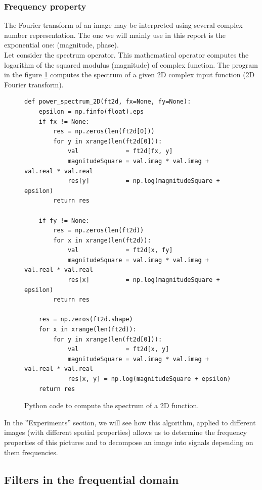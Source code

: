 \documentclass[a4paper]{article}
\begin{document}
        \subsubsection{Frequency property}
        The Fourier transform of an image may be interpreted using several complex number representation.  The one we will mainly use in this report is the exponential one: (magnitude, phase).\\
        Let consider the spectrum operator.   This mathematical operator computes the logarithm of the squared modulus (magnitude) of complex function.   The program in the figure \ref{spectrum2D.py} computes the spectrum of a given 2D complex input function (2D Fourier transform).

        \begin{figure}[h!]
	    \lstset{language=Python}
	    \begin{lstlisting}
def power_spectrum_2D(ft2d, fx=None, fy=None):
    epsilon = np.finfo(float).eps
    if fx != None:
        res = np.zeros(len(ft2d[0]))
        for y in xrange(len(ft2d[0])):
            val             = ft2d[fx, y]
            magnitudeSquare = val.imag * val.imag + val.real * val.real
            res[y]          = np.log(magnitudeSquare + epsilon)
        return res

    if fy != None:
        res = np.zeros(len(ft2d))
        for x in xrange(len(ft2d)):
            val             = ft2d[x, fy]
            magnitudeSquare = val.imag * val.imag + val.real * val.real
            res[x]          = np.log(magnitudeSquare + epsilon)
        return res

    res = np.zeros(ft2d.shape)
    for x in xrange(len(ft2d)):
        for y in xrange(len(ft2d[0])):
            val             = ft2d[x, y]
            magnitudeSquare = val.imag * val.imag + val.real * val.real
            res[x, y] = np.log(magnitudeSquare + epsilon)
    return res
        \end{lstlisting}
        \caption{Python code to compute the spectrum of a 2D function.}
	    \label{spectrum2D.py}
		\end{figure}
        In the ''Experiments'' section, we will see how this algorithm, applied to different images (with different spatial properties) allows us to determine the frequency properties of this pictures and to decompose an image into signals depending on them frequencies.

	\subsection{Filters in the frequential domain}
\end{document}
